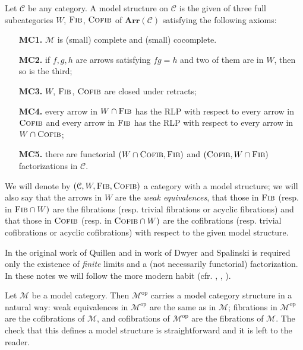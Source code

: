 \begin{refsection}
\begin{defin}
Let $\mathcal C$ be any category. A model structure on $\mathcal C$ is the given of three full subcategories $W$, $\textsc{Fib}$, $\textsc{Cofib}$ of $\mathbf{Arr}(\mathcal C)$ satisfying the following axioms:
\begin{itemize}[leftmargin = 1.4 cm]
\item[{\bfseries MC1.}] $\mathcal M$ is (small) complete and (small) cocomplete.
\item[{\bfseries MC2.}] if $f,g,h$ are arrows satisfying $fg = h$ and two of them are in $W$, then so is the third;
\item[{\bfseries MC3.}] $W$, $\textsc{Fib}$, $\textsc{Cofib}$ are closed under retracts;
\item[{\bfseries MC4.}] every arrow in $W \cap \textsc{Fib}$ has the RLP with respect to every arrow in $\textsc{Cofib}$ and every arrow in $\textsc{Fib}$ has the RLP with respect to every arrow in $W \cap \textsc{Cofib}$;
\item[{\bfseries MC5.}] there are functorial $(W \cap \textsc{Cofib}, \textsc{Fib})$ and $(\textsc{Cofib}, W \cap \textsc{Fib})$ factorizations in $\mathcal C$.
\end{itemize}
We will denote by $(\mathcal C, W,\textsc{Fib},\textsc{Cofib})$ a category with a model structure; we will also say that the arrows in $W$ are the \emph{weak equivalences}, that those in $\textsc{Fib}$ (resp. in $\textsc{Fib} \cap W)$ are the fibrations (resp. trivial fibrations or acyclic fibrations) and that those in $\textsc{Cofib}$ (resp. in $\textsc{Cofib} \cap W)$ are the cofibrations (resp. trivial cofibrations or acyclic cofibrations) with respect to the given model structure.
\end{defin}

\begin{rmk}
In the original work of Quillen \cite{quillen} and in work of Dwyer and Spalinski \cite{dwyer-spalinski-homotopy-theories-and-model-categories} is required only the existence of \emph{finite} limits and a (not necessarily functorial) factorization. In these notes we will follow the more modern habit (cfr. \cite{hovey}, \cite{hirschhorn-model-categories}, \cite{dwyer-hirschhorn-smith-homotopy-limit-functors}).
\end{rmk}

\begin{eg}
Let $\mathcal M$ be a model category. Then $\mathcal M^\mathrm{op}$ carries a model category structure in a natural way: weak equivalences in $\mathcal M^\mathrm{op}$ are the same as in $\mathcal M$; fibrations in $\mathcal M^\mathrm{op}$ are the cofibrations of $\mathcal M$, and cofibrations of $\mathcal M^\mathrm{op}$ are the fibrations of $\mathcal M$. The check that this defines a model structure is straightforward and it is left to the reader.
\end{eg}


\end{refsection}
